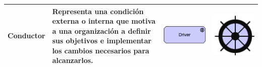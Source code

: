 \begin{longtable}{|p{0.15\linewidth}|p{0.45\linewidth}|p{0.2\linewidth} p{0.2\linewidth}|}
    Conductor &
    Representa una condición externa o interna que motiva a una organización a definir sus objetivos e implementar los cambios necesarios para alcanzarlos. &
\begin{center}
    \includegraphics[width=1\linewidth]{imgs/capa_motivacional/driver1.pdf}
\end{center} &
\begin{center}
    \includegraphics[width=0.5\linewidth]{imgs/capa_motivacional/driver2.pdf}
\end{center}
    \\ \hline


\end{longtable}
